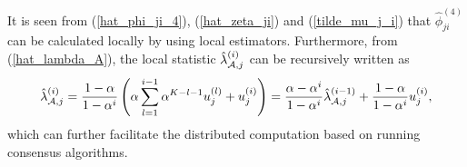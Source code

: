 \documentclass[11pt, draftclsnofoot, onecolumn]{IEEEtran}
\begin{document}


It is seen from (\ref{hat_phi_ji_4}), (\ref{hat_zeta_ji}) and (\ref{tilde_mu_j_i}) that $\hat \phi _{ji}^{\left( 4 \right)}$ can be calculated locally by using local estimators. Furthermore, from (\ref{hat_lambda_A}), the local statistic  $\hat \lambda _{{\cal A},j}^{(i)}$ can be recursively written as
\begin{align}
\hat \lambda _{{\cal A},j}^{(i)} = \frac{{1 - \alpha }}{{1 - {\alpha ^i}}}\left( {\alpha \sum\limits_{l = 1}^{i - 1} {{\alpha ^{K - l - 1}}u_j^{(l)}}  + u_j^{(i)}} \right) = \frac{{\alpha  - {\alpha ^i}}}{{1 - {\alpha ^i}}}\hat \lambda _{{\cal A},j}^{(i - 1)} + \frac{{1 - \alpha }}{{1 - {\alpha ^i}}}u_j^{(i)},
\end{align}
which can further facilitate the distributed computation based on running consensus algorithms.
\end{document}
